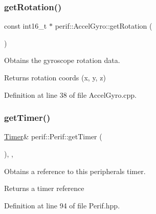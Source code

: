 \subsubsection{\texorpdfstring{getRotation()}{getRotation()}}
{\footnotesize\ttfamily const int16\+\_\+t $\ast$ perif\+::\+Accel\+Gyro\+::get\+Rotation (\begin{DoxyParamCaption}{ }\end{DoxyParamCaption})}

Obtains the gyroscope rotation data.

\begin{DoxyReturn}{Returns}
rotation coords (x, y, z) 
\end{DoxyReturn}


Definition at line 38 of file Accel\+Gyro.\+cpp.


\begin{DoxyCode}{0}

\end{DoxyCode}
\mbox{\label{classperif_1_1Perif_a29c48598a861d85256c30e28af67f864}} 
\subsubsection{\texorpdfstring{getTimer()}{getTimer()}}
{\footnotesize\ttfamily \mbox{\hyperlink{classTimer}{Timer}}\& perif\+::\+Perif\+::get\+Timer (\begin{DoxyParamCaption}{ }\end{DoxyParamCaption})\hspace{0.3cm}{\ttfamily [inline]}, {\ttfamily [protected]}, {\ttfamily [inherited]}}

Obtains a reference to this peripheral\textquotesingle{}s timer.

\begin{DoxyReturn}{Returns}
a timer reference 
\end{DoxyReturn}


Definition at line 94 of file Perif.\+hpp.


\begin{DoxyCode}{0}

\end{DoxyCode}
\mbox{\label{classI2Cdev_a794a92b925f7970399f8b148caa5eef8}} 
